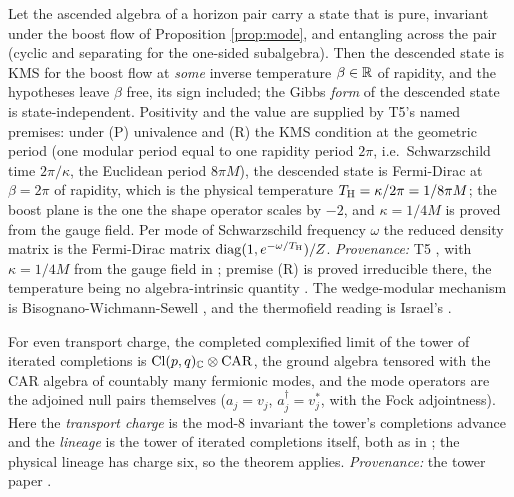 \begin{fact}\label{fact:descent}
Let the ascended algebra of a horizon pair carry a state that is pure, invariant under the boost flow of Proposition \ref{prop:mode}, and entangling across the pair (cyclic and separating for the one-sided subalgebra). Then the descended state is KMS for the boost flow at \emph{some} inverse temperature $\beta \in \mathbb{R}$ of rapidity, and the hypotheses leave $\beta$ free, its sign included; the Gibbs \emph{form} of the descended state is state-independent. Positivity and the value are supplied by T5's named premises: under (P) univalence and (R) the KMS condition at the geometric period (one modular period equal to one rapidity period $2\pi$, i.e.\ Schwarzschild time $2\pi/\kappa$, the Euclidean period $8\pi M$), the descended state is Fermi-Dirac at $\beta = 2\pi$ of rapidity, which is the physical temperature $T_{\mathrm{H}} = \kappa/2\pi = 1/8\pi M$; the boost plane is the one the shape operator scales by $-2$, and $\kappa = 1/4M$ is proved from the gauge field. Per mode of Schwarzschild frequency $\omega$ the reduced density matrix is the Fermi-Dirac matrix $\mathrm{diag}(1, e^{-\omega/T_{\mathrm{H}}})/Z$. \emph{Provenance:} T5 \cite[Thms.~7.3 and 7.6, Prems.~7.8 and 7.19, Prop.~7.18, Thm.~7.20, Cor.~6.4]{ButlerT5}, with $\kappa = 1/4M$ from the gauge field in \cite[App.~A]{ButlerT5}; premise (R) is proved irreducible there, the temperature being no algebra-intrinsic quantity \cite[Thm.~7.16]{ButlerT5}. The wedge-modular mechanism is Bisognano-Wichmann-Sewell \cite{BisognanoWichmann1976, Sewell1982}, and the thermofield reading is Israel's \cite{Israel1976}.
\end{fact}

\begin{fact}\label{fact:car}
For even transport charge, the completed complexified limit of the tower of iterated completions is $\mathrm{Cl}(p,q)_{\mathbb{C}} \otimes \mathrm{CAR}$, the ground algebra tensored with the CAR algebra of countably many fermionic modes, and the mode operators are the adjoined null pairs themselves ($a_j = v_j$, $a_j^\dagger = v_j^*$, with the Fock adjointness). Here the \emph{transport charge} is the mod-8 invariant the tower's completions advance and the \emph{lineage} is the tower of iterated completions itself, both as in \cite{ButlerT3}; the physical lineage has charge six, so the theorem applies. \emph{Provenance:} the tower paper \cite[Prop.~4.1, Thms.~5.3 and 5.6]{ButlerT3}.
\end{fact}

